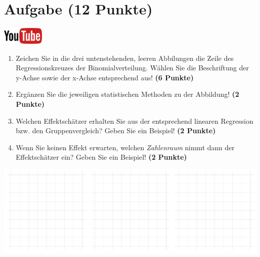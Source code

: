 \documentclass[a4paper, 9pt]{scrartcl}\usepackage[]{graphicx}\usepackage[]{xcolor}
\makeatletter
\def\maxwidth{ %
  \ifdim\Gin@nat@width>\linewidth
    \linewidth
  \else
    \Gin@nat@width
  \fi
}
\makeatother
\begin{document}
\clearpage

\section{Aufgabe \hfill (12 Punkte)}

\hfill\href{https://youtu.be/lHzRgm7hPw0}{\includegraphics[width =
  2cm]{img/youtube}}\\[1Ex]



\begin{enumerate}
\item Zeichen Sie in die drei untenstehenden, leeren Abbilungen die Zeile des
  Regressionskreuzes der Binomialverteilung. W{\"a}hlen Sie die Beschriftung der
  y-Achse sowie der x-Achse entsprechend aus! \textbf{(6 Punkte)}
\item Erg{\"a}nzen Sie die jeweiligen statistischen Methoden zu der Abbildung! \textbf{(2 Punkte)}
\item Welchen Effektsch{\"a}tzer erhalten Sie aus der entsprechend linearen
  Regression bzw. den Gruppenvergleich? Geben Sie ein Beispiel! \textbf{(2 Punkte)}
\item Wenn Sie keinen Effekt erwarten, welchen \textit{Zahlenraum} nimmt dann
  der Effektsch{\"a}tzer ein? Geben Sie ein Beispiel! \textbf{(2 Punkte)}
\end{enumerate}



{\centering \includegraphics[width=\maxwidth]{img/regression-01-1} 

}



 
\clearpage
\end{document}
